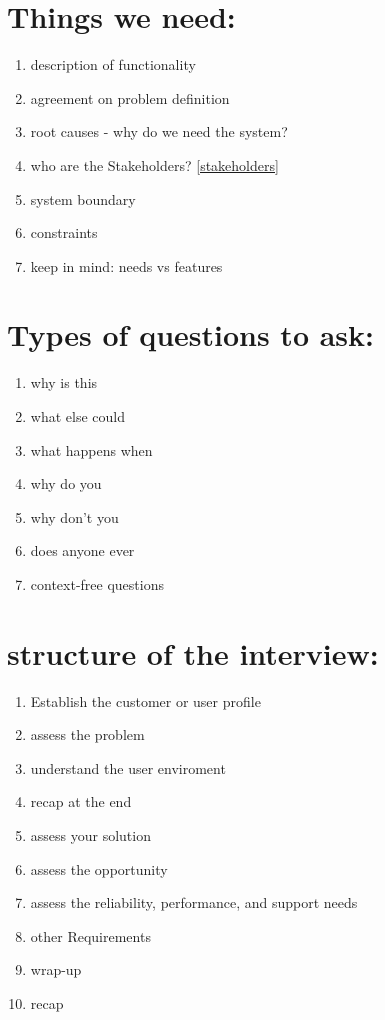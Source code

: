 \documentclass[letterpaper]{article}
\begin{document}
\section{Things we need:}
\begin{enumerate}
 \item description of functionality
 \item agreement on problem definition
 \item root causes - why do we need the system?
 \item who are the Stakeholders?  \ref{stakeholders}
 \item system boundary
 \item constraints
 \item keep in mind: needs vs features
\end{enumerate}

\section{Types of questions to ask:}
\begin{enumerate}
 \item why is this
 \item what else could
 \item what happens when
 \item why do you
 \item why don't you
 \item does anyone ever
 \item context-free questions
\end{enumerate}

\section{structure of the interview:}
\begin{enumerate}
 \item Establish the customer or user profile
 \item assess the problem
 \item understand the user enviroment
 \item recap at the end
 \item assess your solution
 \item assess the opportunity
 \item assess the reliability, performance, and support needs
 \item other Requirements
 \item wrap-up
 \item recap
\end{enumerate}
\end{document}
